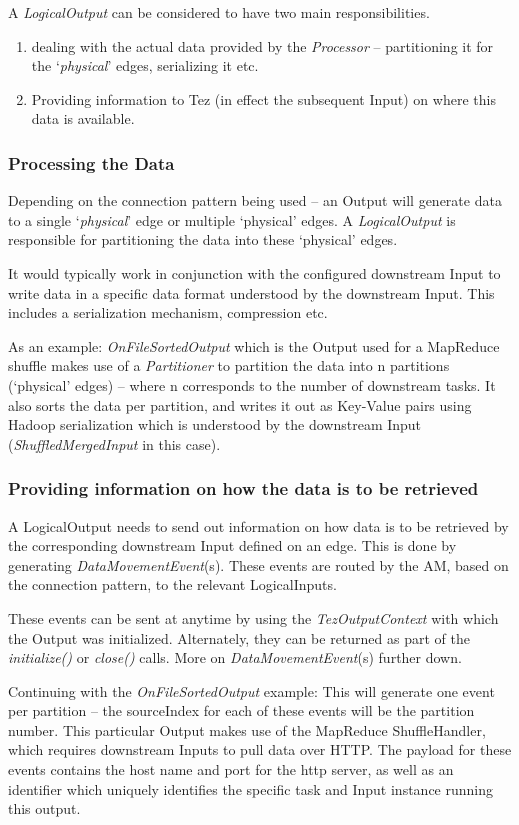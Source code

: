\documentclass[twocolumn]{article}
\newcommand{\be}{\begin{enumerate}}
\newcommand{\ee}{\end{enumerate}}
\newcommand{\ii}{\item}
\begin{document}
A \textit{LogicalOutput} can be considered to have two main responsibilities.

\be
\ii dealing with the actual data provided by the \textit{Processor} --
partitioning it for the `\textit{physical}' edges, serializing it etc.
\ii Providing information to Tez (in effect the subsequent Input) on where
this data is available.
\ee
\subsubsection*{Processing the Data}
Depending on the connection pattern being used -- an Output will
generate data to a single `\textit{physical}' edge or multiple `physical' edges.
A \textit{LogicalOutput} is responsible for partitioning the data into these
`physical' edges.

It would typically work in conjunction with the configured downstream
Input to write data in a specific data format understood by the
downstream Input. This includes a serialization mechanism, compression
etc.

As an example: \textit{OnFileSortedOutput} which is the Output used for a
MapReduce shuffle makes use of a \textit{Partitioner} to partition the data into
n partitions (`physical' edges) -- where n corresponds to the number of
downstream tasks. It also sorts the data per partition, and writes it
out as Key-Value pairs using Hadoop serialization which is understood by
the downstream Input (\textit{ShuffledMergedInput} in this case).

\subsubsection*{Providing information on how the data is to be retrieved}
A LogicalOutput needs to send out information on how data is to be
retrieved by the corresponding downstream Input defined on an edge. This
is done by generating \textit{DataMovementEvent}(s). These events are routed by
the AM, based on the connection pattern, to the relevant LogicalInputs.

These events can be sent at anytime by using the \textit{TezOutputContext} with
which the Output was initialized. Alternately, they can be returned as
part of the \textit{initialize()} or \textit{close()} calls. More on \textit{DataMovementEvent}(s)
further down.

Continuing with the \textit{OnFileSortedOutput} example: This will generate one
event per partition -- the sourceIndex for each of these events will be
the partition number. This particular Output makes use of the MapReduce
ShuffleHandler, which requires downstream Inputs to pull data over HTTP.
The payload for these events contains the host name and port for the
http server, as well as an identifier which uniquely identifies the
specific task and Input instance running this output.
\end{document}
